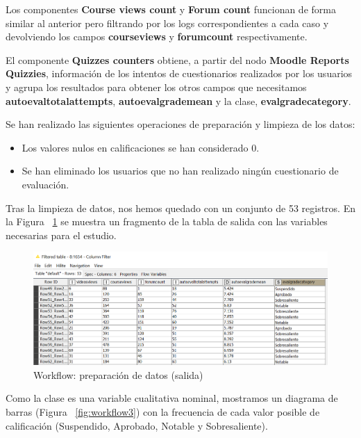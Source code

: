 Los componentes \textbf{Course views count} y \textbf{Forum count} funcionan de forma similar al anterior pero filtrando por los logs correspondientes a cada caso y 
devolviendo los campos \textbf{courseviews} y \textbf{forumcount} respectivamente. 

El componente \textbf{Quizzes counters} obtiene, a partir del nodo \textbf{Moodle Reports Quizzies}, información de los intentos de cuestionarios 
realizados por los usuarios y agrupa los resultados para obtener los otros campos que necesitamos \textbf{autoevaltotalattempts}, \textbf{autoevalgrademean} y la clase, \textbf{evalgradecategory}.

Se han realizado las siguientes operaciones de preparación y limpieza de los datos: 

\begin{itemize}
	\item Los valores nulos en calificaciones se han considerado 0. 
	\item Se han eliminado los usuarios que no han realizado ningún cuestionario de evaluación.
\end{itemize}

Tras la limpieza de datos, nos hemos quedado con un conjunto de 53 registros. En la Figura ~\ref{fig:workflow2} se muestra un fragmento de la tabla de salida con las variables necesarias para el estudio. 

\begin{figure}[!htb]
	\centering
	\includegraphics[width=1\textwidth]{img/workflow2.png}
	\caption{Workflow: preparación de datos (salida)}
	\label{fig:workflow2}
\end{figure}
\FloatBarrier

Como la clase es una variable cualitativa nominal, mostramos un diagrama de barras (Figura ~\ref{fig:workflow3}) con la frecuencia de cada valor posible de calificación (Suspendido, Aprobado, Notable y Sobresaliente). 

